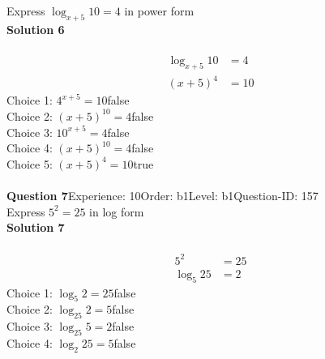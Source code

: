 \documentclass{article}
\begin{document}
Express $\log_{x+5}10=4$ in power form\\[4pt]
\noindent\textbf{Solution 6}\\[2pt]
\\[-35pt]\begin{align*}
\log_{x+5}10&=4\\[2pt]
(x+5)^4&=10
\end{align*}
Choice 1: \hspace{20pt}$4^{x+5}=10$\hspace{20pt}false\\
Choice 2: \hspace{20pt}$(x+5)^{10}=4$\hspace{20pt}false\\
Choice 3: \hspace{20pt}$10^{x+5}=4$\hspace{20pt}false\\
Choice 4: \hspace{20pt}$(x+5)^{10}=4$\hspace{20pt}false\\
Choice 5: \hspace{20pt}$(x+5)^4=10$\hspace{20pt}true\\
\\[4pt]
\noindent\textbf{Question 7}\hspace{20pt}Experience: 10\hspace{20pt}Order: b1\hspace{20pt}Level: b1\hspace{20pt}Question-ID: 157\\[2pt]
Express $5^2=25$ in log form\\[4pt]
\noindent\textbf{Solution 7}\\[2pt]
\\[-35pt]\begin{align*}
5^2&=25\\[2pt]
\log_{5}25&=2
\end{align*}
Choice 1: \hspace{20pt}$\log_{5}2=25$\hspace{20pt}false\\
Choice 2: \hspace{20pt}$\log_{25}2=5$\hspace{20pt}false\\
Choice 3: \hspace{20pt}$\log_{25}5=2$\hspace{20pt}false\\
Choice 4: \hspace{20pt}$\log_{2}25=5$\hspace{20pt}false\\
\end{document}
